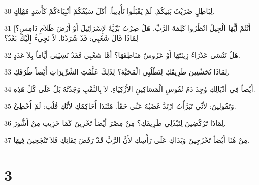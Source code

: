 \par 30 لِبَاطِلٍ ضَرَبْتُ بَنِيكُمْ. لَمْ يَقْبَلُوا تَأْدِيباً. أَكَلَ سَيْفُكُمْ أَنْبِيَاءَكُمْ كَأَسَدٍ مُهْلِكٍ.
\par 31 [أَنْتُمْ أَيُّهَا الْجِيلُ انْظُرُوا كَلِمَةَ الرَّبِّ. هَلْ صِرْتُ بَرِّيَّةً لإِسْرَائِيلَ أَوْ أَرْضَ ظَلاَمٍ دَامِسٍ؟ لِمَاذَا قَالَ شَعْبِي: قَدْ شَرَدْنَا. لاَ نَجِيءُ إِلَيْكَ بَعْدُ؟
\par 32 هَلْ تَنْسَى عَذْرَاءٌ زِينَتَهَا أَوْ عَرُوسٌ مَنَاطِقَهَا؟ أَمَّا شَعْبِي فَقَدْ نَسِيَنِي أَيَّاماً بِلاَ عَدَدٍ.
\par 33 لِمَاذَا تُحَسِّنِينَ طَرِيقَكِ لِتَطْلُبِي الْمَحَبَّةَ؟ لِذَلِكَ عَلَّمْتِ الشِّرِّيرَاتِ أَيْضاً طُرُقَكِ.
\par 34 أَيْضاً فِي أَذْيَالِكِ وُجِدَ دَمُ نُفُوسِ الْمَسَاكِينِ الأَزْكِيَاءِ. لاَ بِالنَّقْبِ وَجَدْتُهُ بَلْ عَلَى كُلِّ هَذِهِ.
\par 35 وَتَقُولِينَ: لأَنِّي تَبَرَّأْتُ ارْتَدَّ غَضَبُهُ عَنِّي حَقّاً. هَئَنَذَا أُحَاكِمُكِ لأَنَّكِ قُلْتِ: لَمْ أُخْطِئْ.
\par 36 لِمَاذَا تَرْكُضِينَ لِتَبْدُلِي طَرِيقَكِ؟ مِنْ مِصْرَ أَيْضاً تَخْزِينَ كَمَا خَزِيتِ مِنْ أَشُّورَ.
\par 37 مِنْ هُنَا أَيْضاً تَخْرُجِينَ وَيَدَاكِ عَلَى رَأْسِكِ لأَنَّ الرَّبَّ قَدْ رَفَضَ ثِقَاتِكِ فَلاَ تَنْجَحِينَ فِيهَا.

\chapter{3}

